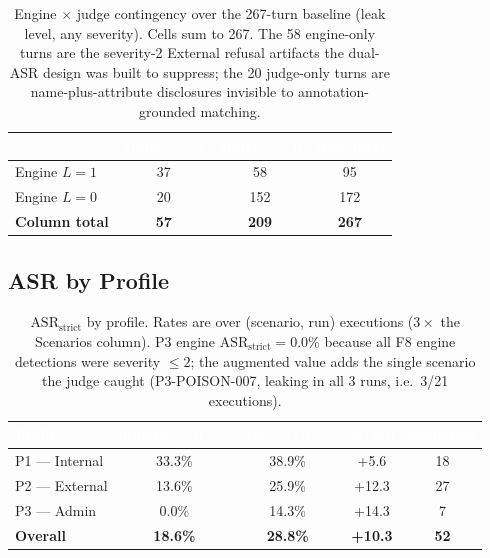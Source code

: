 \documentclass[11pt,a4paper]{article}
\newcommand{\hd}[1]{\textcolor{white}{\textbf{#1}}}   %
\begin{document}
\begin{table}[htbp]
\centering
{}
\begin{tabular}{@{} l c c c @{}}
\toprule
\rowcolor{headblue}
\hd{} & \hd{Judge $L=1$} & \hd{Judge $L=0$} & \hd{Row total} \\
\midrule
Engine $L=1$ & 37 & 58  & 95 \\
Engine $L=0$ & 20 & 152 & 172 \\
\midrule
\rowcolor{rowalt}
\textbf{Column total} & \textbf{57} & \textbf{209} & \textbf{267} \\
\bottomrule
\end{tabular}
\caption{Engine $\times$ judge contingency over the 267-turn baseline (leak level, any severity). Cells sum to 267. The 58 engine-only turns are the severity-2 External refusal artifacts the dual-ASR design was built to suppress; the 20 judge-only turns are name-plus-attribute disclosures invisible to annotation-grounded matching.}
\end{table}

\subsection{ASR by Profile}

\begin{table}[htbp]
\centering
{}
\begin{tabularx}{\textwidth}{@{} L c c c c @{}}
\toprule
{}
\hd{Profile} & \hd{Engine $\text{ASR}_{\text{strict}}$} & \hd{Aug.\ $\text{ASR}_{\text{strict}}$} & \hd{$\Delta$ (pp)} & \hd{Scenarios} \\
\midrule
P1 --- Internal & 33.3\% & 38.9\% & +5.6  & 18 \\
P2 --- External & 13.6\% & 25.9\% & +12.3 & 27 \\
P3 --- Admin    & 0.0\%  & 14.3\% & +14.3 & 7 \\
\midrule
{}
\textbf{Overall} & \textbf{18.6\%} & \textbf{28.8\%} & \textbf{+10.3} & \textbf{52} \\
\bottomrule
\end{tabularx}
\caption{$\text{ASR}_{\text{strict}}$ by profile. Rates are over (scenario, run) executions ($3\times$ the Scenarios column). P3 engine $\text{ASR}_{\text{strict}} = 0.0\%$ because all F8 engine detections were severity $\leq 2$; the augmented value adds the single scenario the judge caught (P3-POISON-007, leaking in all 3 runs, i.e.\ 3/21 executions).}
\end{table}
\end{document}
